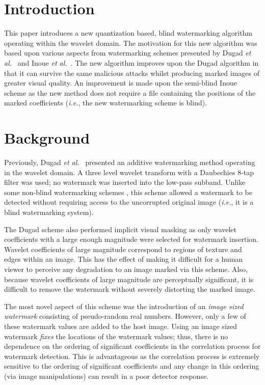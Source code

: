 \documentclass[10pt,twocolumn]{article}
\begin{document}
\section{Introduction}
This paper introduces a new quantization based, blind watermarking algorithm operating within the wavelet domain. 
The motivation for this new algorithm was based upon various aspects from watermarking schemes presented by Dugad \emph{et al.}~\cite{dugad}
and Inoue \emph{et al.}~\cite{inoue}. The new algorithm improves upon the Dugad algorithm in that it can survive the same malicious attacks
whilst producing marked images of greater visual quality. An improvement is made upon the semi-blind Inoue scheme as the new method does not require
a file containing the positions of the marked coefficients (\emph{i.e.}, the new watermarking scheme is blind).




\section{Background}
Previously, Dugad \emph{et al.}~\cite{dugad} presented an additive watermarking method operating 
in the wavelet domain. A three level wavelet transform with a Daubechies 8-tap filter was used;
no watermark was inserted into the low-pass subband. 
Unlike some non-blind watermarking schemes \cite{cox, corvi},
this scheme allowed a watermark to be detected without requiring access
to the uncorrupted original image (\emph{i.e.}, it is a blind watermarking system).

The Dugad scheme also performed implicit visual masking as only wavelet coefficients
with a large enough magnitude were selected for watermark insertion.
Wavelet coefficients of large magnitude correspond
to regions of texture and edges within an image. This has the effect of making it difficult for a human 
viewer to perceive any degradation to an image marked via this scheme. Also, because wavelet coefficients
of large magnitude are perceptually significant, it is difficult to remove the watermark
without severely distorting the marked image.

The most novel aspect of this scheme was the introduction of
an \emph{image sized watermark} consisting of pseudo-random real numbers. 
However, only a few of these watermark values are added to the host image. Using an
image sized watermark \emph{fixes} the locations of the watermark values; thus, there is
no dependence on the ordering of significant coefficients in the correlation process for watermark detection.
This is advantageous as the correlation process is extremely sensitive to the ordering of significant coefficients and any
change in this ordering (via image manipulations) can result in a poor detector response.
\end{document}
